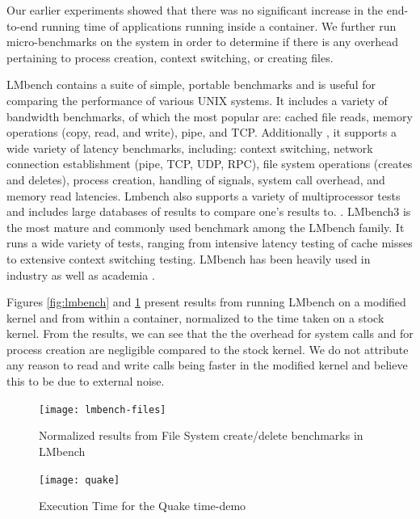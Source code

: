 Our earlier experiments showed that there was no significant increase in the end-to-end running time of applications running inside a container.  We further run micro-benchmarks on the system in order to determine if there is any overhead pertaining to process creation, context switching, or creating files.

LMbench contains a suite of simple, portable benchmarks and is useful for comparing the performance of various UNIX systems.  It includes a variety of bandwidth benchmarks, of which the most popular are: cached file reads, memory operations (copy, read, and write), pipe, and TCP.  Additionally , it supports a wide variety of latency benchmarks, including: context switching, network connection establishment (pipe, TCP, UDP, RPC), file system operations (creates and deletes), process creation, handling of signals, system call overhead, and memory read latencies.  Lmbench also supports a variety of multiprocessor tests and includes large databases of results to compare one's results to. \cite{lmbench_paper}. LMbench3 is the most mature and commonly used benchmark among the LMbench family.  It runs a wide variety of tests, ranging from intensive latency testing of cache misses to extensive context switching testing.  LMbench has been heavily used in industry as well as academia \cite{lmbench}.

Figures \ref{fig:lmbench} and \ref{fig:lmbench-files} present results from running LMbench on a modified kernel and from within a container, normalized to the time taken on a stock kernel.  From the results, we can see that the the overhead for system calls and for process creation are negligible compared to the stock kernel. We do not attribute any reason to read and write calls being faster in the modified kernel and believe this to be due to external noise. 

\begin{figure}[bth]
\centering
\texttt{[image: lmbench-files]}
\caption{Normalized results from File System create/delete benchmarks in LMbench}
\label{fig:lmbench-files}
\end{figure}

\begin{figure}[tbh]
\centering
\texttt{[image: quake]}
\caption{Execution Time for the Quake time-demo}
\label{fig:Quake}
\end{figure}

